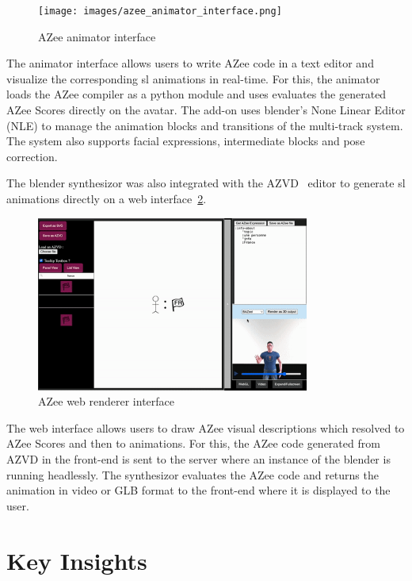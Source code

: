 \documentclass[../../main.tex]{subfiles}
\begin{document}
\begin{figure}[ht]
    \centering
    \texttt{[image: images/azee\_animator\_interface.png]}
    \caption{AZee animator interface}
    \label{fig:azee_animator_interface}
\end{figure}

The animator interface allows users to write AZee code in a text editor and visualize the corresponding \gls{sl} animations in real-time. For this, the animator loads the AZee compiler as a python module and uses evaluates the generated AZee Scores directly on the avatar. The add-on uses blender's None Linear Editor (NLE) to manage the animation blocks and transitions of the multi-track system. The system also supports facial expressions, intermediate blocks and pose correction.

The blender synthesizor was also integrated with the AZVD~\cite{filhol2024software} editor to generate \gls{sl} animations directly on a web interface~\ref{fig:azee_web_interface}.

\begin{figure}[ht]
    \centering
    \includegraphics[width=0.8\textwidth]{images/azee_web_interface.png}
    \caption{AZee web renderer interface}
    \label{fig:azee_web_interface}
\end{figure}

The web interface allows users to draw AZee visual descriptions which resolved to AZee Scores and then to animations. For this, the AZee code generated from AZVD in the front-end is sent to the server where an instance of the blender is running headlessly. The synthesizor evaluates the AZee code and returns the animation in video or GLB format to the front-end where it is displayed to the user.

\section{Key Insights}
\label{ch:conclusion:key_insights}
\end{document}

